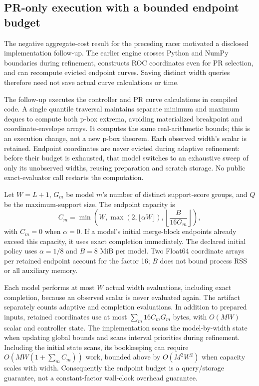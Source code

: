 \subsection{PR-only execution with a bounded endpoint budget}
\label{sec:pr-engine}
The negative aggregate-cost result for the preceding racer motivated a
disclosed implementation follow-up. The earlier engine crosses Python and
NumPy boundaries during refinement, constructs ROC coordinates even for PR
selection, and can recompute evicted endpoint curves. Saving distinct width
queries therefore need not save actual curve calculations or time.

The follow-up executes the controller and PR curve calculations in compiled
code. A single quantile traversal maintains separate minimum and maximum
deques to compute both p-box extrema, avoiding materialized breakpoint and
coordinate-envelope arrays. It computes the same real-arithmetic bounds;
this is an execution change, not a new p-box theorem. Each observed width's
scalar is retained. Endpoint coordinates are never evicted during adaptive
refinement: before their budget is exhausted, that model switches to an
exhaustive sweep of only its unobserved widths, reusing preparation and
scratch storage. No public exact-evaluator call restarts the computation.

Let $W=L+1$, $G_m$ be model $m$'s number of distinct support-score groups,
and $Q$ be the maximum-support size. The endpoint capacity is
\[
 C_m=\min\!\left(W,\max(2,\lfloor\alpha W\rfloor),
             \left\lfloor\frac{B}{16G_m}\right\rfloor\right),
\]
with $C_m=0$ when $\alpha=0$. If a model's initial merge-block endpoints
already exceed this capacity, it uses exact completion immediately. The
declared initial policy uses $\alpha=1/8$ and $B=8$ MiB per model. Two
Float64 coordinate arrays per retained endpoint account for the factor 16;
$B$ does not bound process RSS or all auxiliary memory.

Each model performs at most $W$ actual width evaluations, including exact
completion, because an observed scalar is never evaluated again. The
artifact separately counts adaptive and completion evaluations. In addition
to prepared inputs, retained coordinates use at most $\sum_m16C_mG_m$
bytes, with $O(MW)$ scalar and controller state. The implementation scans
the model-by-width state when updating global bounds and scans interval
priorities during refinement. Including the initial state scans, its bookkeeping
can require $O(MW(1+\sum_m C_m))$ work, bounded above by $O(M^2W^2)$ when capacity scales
with width. Consequently the endpoint budget is a query/storage guarantee,
not a constant-factor wall-clock overhead guarantee.

